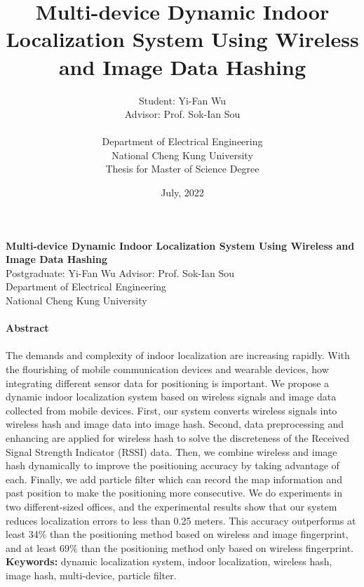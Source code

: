 \documentclass[a4paper,12pt]{report}
\title{Multi-device Dynamic Indoor Localization System Using Wireless and Image Data Hashing \\}
\author{Student: Yi-Fan Wu \\
Advisor: Prof. Sok-Ian Sou\\
\\
Department of Electrical Engineering  \\
National Cheng Kung University \\
Thesis for Master of Science Degree \\
}
\date{July, 2022}
\begin{document}

\maketitle

\begin{titlepage}
    \begin{center}
        {\bf\large Multi-device Dynamic Indoor Localization System Using Wireless and Image Data Hashing}\\
        {Postgraduate: Yi-Fan Wu \hspace{8mm} Advisor: Prof. Sok-Ian Sou}\\
        {Department of Electrical Engineering}\\
        {National Cheng Kung University}\\
    \end{center}

    \paragraph{}
    \begin{center}
        {\bf Abstract}\\
    \end{center}
    \paragraph{}
     The demands and complexity of indoor localization are increasing rapidly. With the flourishing of mobile communication devices and wearable devices, how integrating different sensor data for positioning is important. We propose a dynamic indoor localization system based on wireless signals and image data collected from mobile devices. First, our system converts wireless signals into wireless hash and image data into image hash. Second, data preprocessing and enhancing are applied for wireless hash to solve the discreteness of the Received Signal Strength Indicator (RSSI) data. Then, we combine wireless and image hash dynamically to improve the positioning accuracy by taking advantage of each. Finally, we add particle filter which can record the map information and past position to make the positioning more consecutive. We do experiments in two different-sized offices, and the experimental results show that our system reduces localization errors to less than 0.25 meters. This accuracy outperforms at least 34\% than the positioning method based on wireless and image fingerprint, and at least 69\% than the positioning method only based on wireless fingerprint. \\
 
    \textbf{Keywords:} {dynamic localization system, indoor localization, wireless hash, image hash, multi-device, particle filter.}
\end{titlepage}
\end{document}
